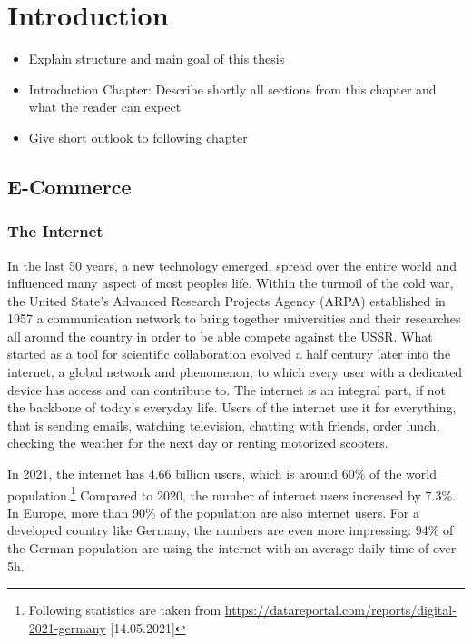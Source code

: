 \chapter{Introduction}

\begin{itemize}
	\item Explain structure and main goal of this thesis
	\item Introduction Chapter: Describe shortly all sections from this chapter and what the reader can expect
	\item Give short outlook to following chapter
\end{itemize}




\section{E-Commerce}


\subsection{The Internet}

In the last 50 years, a new technology emerged, spread over the entire world and influenced many aspect of most peoples life.
Within the turmoil of the cold war, the United State's Advanced Research Projects Agency (ARPA) established in 1957 a communication network to bring together universities and their researches all around the country in order to be able compete against the USSR.
What started as a tool for scientific collaboration evolved a half century later into the internet, a global network and phenomenon, to which every user with a dedicated device has access and can contribute to.
The internet is an integral part, if not the backbone of today's everyday life.
Users of the internet use it for everything, that is sending emails, watching television, chatting with friends, 
order lunch, checking the weather for the next day or renting motorized scooters.


In 2021, the internet has 4.66 billion users, which is around 60\% of the world population.\footnote{Following statistics are taken from \url{https://datareportal.com/reports/digital-2021-germany} [14.05.2021]}
Compared to 2020, the number of internet users increased by 7.3\%.
In Europe, more than 90\% of the population are also internet users.
For a developed country like Germany, the numbers are even more impressing:
94\% of the German population are using the internet with an average daily time of over 5h.

